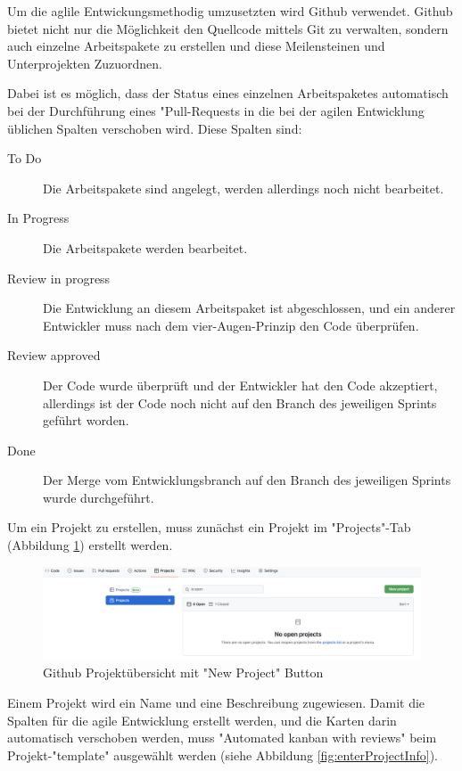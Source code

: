 
Um die aglile Entwickungsmethodig umzusetzten wird Github verwendet. 
Github bietet nicht nur die Möglichkeit den Quellcode mittels Git zu verwalten, sondern auch einzelne Arbeitspakete zu erstellen und diese Meilensteinen und Unterprojekten Zuzuordnen.

Dabei ist es möglich, dass der Status eines einzelnen Arbeitspaketes automatisch bei der Durchführung eines "Pull-Requests in die bei der agilen Entwicklung üblichen Spalten verschoben wird. Diese Spalten sind:

\begin{description}
    \item[To Do] Die Arbeitspakete sind angelegt, werden allerdings noch nicht bearbeitet.
    \item[In Progress] Die Arbeitspakete werden bearbeitet.
    \item[Review in progress] Die Entwicklung an diesem Arbeitspaket ist abgeschlossen, und ein anderer Entwickler muss nach dem vier-Augen-Prinzip den Code überprüfen. 
    \item[Review approved] Der Code wurde überprüft und der Entwickler hat den Code akzeptiert, allerdings ist der Code noch nicht auf den Branch des jeweiligen Sprints geführt worden.
    \item[Done] Der Merge vom Entwicklungsbranch auf den Branch des jeweiligen Sprints wurde durchgeführt.
\end{description}



Um ein Projekt zu erstellen, muss zunächst ein Projekt im "Projects"-Tab (Abbildung \ref{fig:newProject}) erstellt werden.

\begin{figure}[H]
    \centering
    \includegraphics[width=\textwidth]{media/ProjectManagement/CreateProject.png}
    \caption{Github Projektübersicht mit "New Project" Button}
    \label{fig:newProject}
\end{figure}

Einem Projekt wird ein Name und eine Beschreibung zugewiesen. Damit die Spalten für die agile Entwicklung erstellt werden, und die Karten darin automatisch verschoben werden, muss  "Automated kanban with reviews" beim Projekt-"template" ausgewählt werden (siehe Abbildung \ref{fig:enterProjectInfo}).

